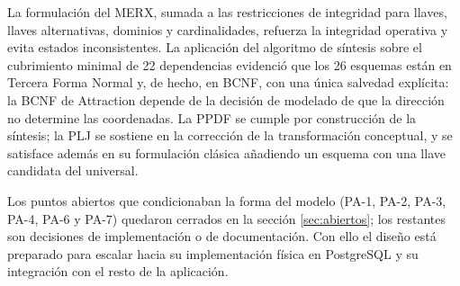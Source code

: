 \documentclass[11pt,a4paper]{article}
\begin{document}
La formulación del MERX, sumada a las restricciones de integridad para llaves, llaves alternativas, dominios y cardinalidades, refuerza la integridad operativa y evita estados inconsistentes. La aplicación del algoritmo de síntesis sobre el cubrimiento minimal de 22 dependencias evidenció que los 26 esquemas están en Tercera Forma Normal y, de hecho, en BCNF, con una única salvedad explícita: la BCNF de Attraction depende de la decisión de modelado de que la dirección no determine las coordenadas. La PPDF se cumple por construcción de la síntesis; la PLJ se sostiene en la corrección de la transformación conceptual, y se satisface además en su formulación clásica añadiendo un esquema con una llave candidata del universal.

Los puntos abiertos que condicionaban la forma del modelo (PA-1, PA-2, PA-3, PA-4, PA-6 y PA-7) quedaron cerrados en la sección \ref{sec:abiertos}; los restantes son decisiones de implementación o de documentación. Con ello el diseño está preparado para escalar hacia su implementación física en PostgreSQL y su integración con el resto de la aplicación.
\end{document}
